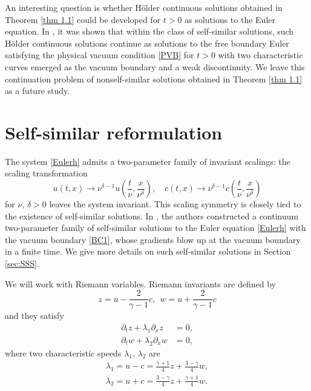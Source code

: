 \documentclass{article}
\newcommand{\ga}{\gamma}
\newcommand{\la}{\lambda}
\def\be{\begin{equation}}
\def\ee{\end{equation}}
\def\beqa{\begin{equation}\begin{aligned}}
\def\eeqa{\end{aligned}\end{equation}}
\numberwithin{equation}{section}
\begin{document}
An interesting question is whether H\"{o}lder continuous solutions obtained in Theorem \ref{thm 1.1} could be developed for $t>0$ as solutions to the Euler equation. In \cite{JLN2025}, it was shown that within the class of self-similar solutions, such H\"{o}lder continuous solutions continue as solutions to the free boundary Euler satisfying the physical vacuum condition \eqref{PVB} for $t>0$ with two characteristic curves emerged as the vacuum boundary and a weak discontinuity. We leave this continuation problem of nonself-similar solutions obtained in Theorem \ref{thm 1.1} as a future study. 










\section{Self-similar reformulation}\label{section 2}


The system \eqref{Eulerh} admits a two-parameter family of invariant scalings: the scaling transformation
\be\label{scaling}
u (t,x) \to \nu^{\delta -1 } u ( \frac{t}{\nu},\frac{x}{\nu^\delta }), \quad c (t,x) \to  \nu^{\delta -1 } c ( \frac{t}{\nu},\frac{x}{\nu^\delta })
\ee
for $\nu, \, \delta >0$ leaves the system invariant. This scaling symmetry is closely tied to the existence of self-similar solutions. In \cite{JLN2025}, the authors constructed a continuum two-parameter family of self-similar solutions to the Euler equation \eqref{Eulerh} with the vacuum boundary \eqref{BC1}, whose gradients blow up at the vacuum boundary in a finite time. We give more details on such self-similar solutions in Section \ref{sec:SSS}.   


	


We will work with Riemann variables. Riemann invariants are 
defined by 
\be\label{RI}
	z = u -\frac{2}{\ga-1}c, \ \  w = u +\frac{2}{\ga-1}c 
\ee
and they satisfy
\be\label{EE z w}
	\begin{aligned}
		\partial_t z+\la_1\partial_x z &= 0,\\
		\partial_t w +\la_2 \partial_x w &=0, 
 	\end{aligned}
\ee
where two characteristic speeds $\la_1$, $\la_2$ are 
\beqa
	\la_1 = u - c=\frac{\ga+1}{4} z + \frac{3-\ga}{4} w, \\
	 \la_2 = u +c= \frac{3-\ga}{4} z + \frac{\ga+1}{4} w.
\eeqa
\end{document}
